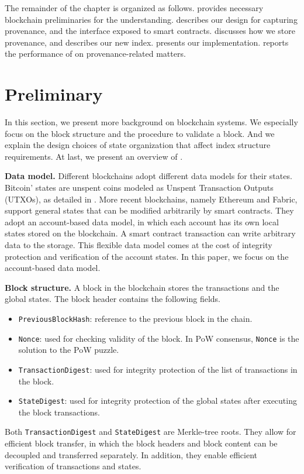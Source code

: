 The remainder of the chapter is organized as follows.  provides necessary blockchain preliminaries for the understanding.  describes our design for capturing provenance, and the interface
exposed to smart contracts.  discusses how we store provenance, and
 describes our new index.  presents our
implementation.  reports the performance of {\fs} on provenance-related matters. 

\section{Preliminary}
\label{sec:provenance:background}
In this section, we present more background on blockchain systems.
We especially focus on the block structure and the procedure to validate a block. 
And we explain the design choices of state organization that affect index structure requirements.
At last, we present an overview of {\fs}. 

\textbf{Data model.} Different blockchains adopt different data models for their states. Bitcoin' states
are unspent coins modeled as Unspent Transaction Outputs (UTXOs), as detailed in . More recent blockchains, namely Ethereum and Fabric, support general states that can be modified arbitrarily
by smart contracts.  They adopt an account-based data model, in which each account has its own local states
stored on the blockchain. A smart contract transaction can write arbitrary data to the storage. This flexible
data model comes at the cost of integrity protection and verification of the account states. In this paper, we
focus on the account-based data model.

\textbf{Block structure.} A block in the blockchain stores the transactions and the global states.
The block header contains the following fields.  
\begin{itemize} 
    \item \texttt{PreviousBlockHash}: reference to the previous block in the chain. 
    \item \texttt{Nonce}: used for checking validity of the block. In PoW consensus, \texttt{Nonce} is the solution to the PoW puzzle. 
    \item \texttt{TransactionDigest}: used for integrity protection of the list of transactions in the block. 
    \item \texttt{StateDigest}: used for integrity protection of the global states after executing the block transactions. 
\end{itemize}
Both \texttt{TransactionDigest} and \texttt{StateDigest} are Merkle-tree roots. They allow for efficient block
transfer, in which the block headers and block content can be decoupled and transferred separately. In
addition, they enable efficient verification of transactions and states.

